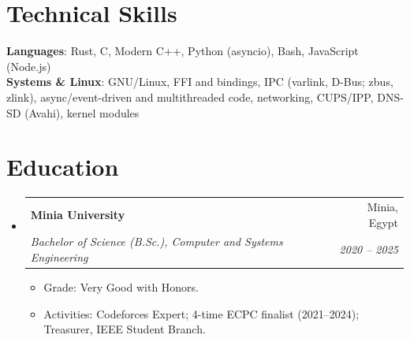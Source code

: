 \documentclass[letterpaper,11pt]{article}
\makeatletter
\newcommand{\resumeItem}[1]{
  \item\small{
    {#1 \vspace{-2pt}}
  }
}
\newcommand{\resumeSubheading}[4]{
  \vspace{-2pt}\item
    \begin{tabular*}{0.97\textwidth}[t]{l@{\extracolsep{\fill}}r}
      \textbf{#1} & #2 \\
      \textit{\small#3} & \textit{\small #4} \\
    \end{tabular*}\vspace{-7pt}
}
\newcommand{\resumeSubHeadingListStart}{\begin{itemize}[leftmargin=0.15in, label={}]}
\newcommand{\resumeSubHeadingListEnd}{\end{itemize}}
\newcommand{\resumeItemListStart}{\begin{itemize}}
\newcommand{\resumeItemListEnd}{\end{itemize}\vspace{-5pt}}
\makeatother
\begin{document}
%
\section{Technical Skills}
 \begin{itemize}[leftmargin=0.15in, label={}]
    \small{\item{
     \textbf{Languages}{: Rust, C, Modern C++, Python (asyncio), Bash, JavaScript (Node.js)} \\
     \textbf{Systems \& Linux}{: GNU/Linux, FFI and bindings, IPC (varlink, D-Bus; zbus, zlink), async/event-driven and multithreaded code, networking, CUPS/IPP, DNS-SD (Avahi), kernel modules}
    }}
 \end{itemize}

\section{Education}
  \resumeSubHeadingListStart
    \resumeSubheading
      {Minia University}{Minia, Egypt}
      {Bachelor of Science (B.Sc.), Computer and Systems Engineering}{2020 -- 2025}
      \resumeItemListStart
        \resumeItem{Grade: Very Good with Honors.}
        \resumeItem{Activities: Codeforces Expert; 4-time ECPC finalist (2021--2024); Treasurer, IEEE Student Branch.}
      \resumeItemListEnd
  \resumeSubHeadingListEnd


\end{document}
